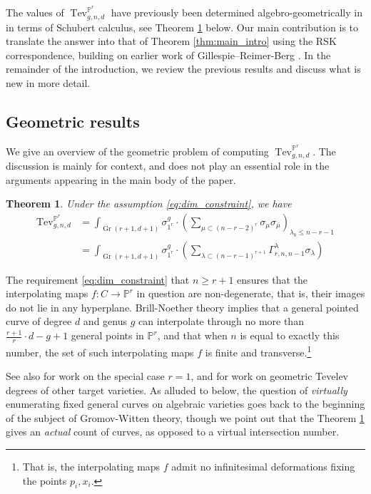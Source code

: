 \documentclass[12pt]{amsart}
\def\bP{\mathbb{P}}
\DeclareMathOperator{\Gr}{Gr}
\DeclareMathOperator{\Tev}{Tev}
\newtheorem{theorem}[definition]{Theorem}
\begin{document}
The values of $\Tev^{\bP^r}_{g,n,d}$ have previously been determined algebro-geometrically in \cite{tev_Pr} in terms of Schubert calculus, see Theorem \ref{thm:tev_Pr} below. Our main contribution is to translate the answer into that of Theorem \ref{thm:main_intro} using the RSK correspondence, building on earlier work of Gillespie--Reimer-Berg \cite{GenRSK}. In the remainder of the introduction, we review the previous results and discuss what is new in more detail.

\subsection{Geometric results}

We give an overview of the geometric problem of computing $\Tev^{\bP^r}_{g,n,d}$. The discussion is mainly for context, and does not play an essential role in the arguments appearing in the main body of the paper.

\begin{theorem}\cite[Theorem 1.1, Theorem 7.9]{tev_Pr}\label{thm:tev_Pr}
Under the assumption \eqref{eq:dim_constraint}, we have
    \begin{align*}
\Tev^{\bP^r}_{g,n,d}&=\displaystyle\int_{\Gr(r+1,d+1)}\sigma^g_{1^r}\cdot \left(\sum_{\mu\subset(n-r-2)^{r}}\sigma_{\mu}\sigma_{\overline{\mu}}\right)_{\lambda_0\le n-r-1}\\
&=\displaystyle\int_{\Gr(r+1,d+1)}\sigma^g_{1^r}\cdot \left(\sum_{\lambda\subset (n-r-1)^{r+1}} \Gamma^\lambda_{r,n,n-1}\sigma_{\lambda}\right)
\end{align*}
\end{theorem}

The requirement \eqref{eq:dim_constraint} that $n\ge r+1$ ensures that the interpolating maps $f:C\to\bP^r$ in question are non-degenerate, that is, their images do not lie in any hyperplane. Brill-Noether theory implies that a general pointed curve of degree $d$ and genus $g$ can interpolate through no more than $\frac{r+1}{r}\cdot d-g+1$ general points in $\bP^r$, and that when $n$ is equal to exactly this number, the set of such interpolating maps $f$ is finite and transverse.\footnote{That is, the interpolating maps $f$ admit no infinitesimal deformations fixing the points $p_i,x_i$.}

See also \cite{tevelev,cps,fl,cl1,Troptev} for work on the special case $r=1$, and \cite{lian_hyp,cl2,cl_hirzebruch,cl_complete,ls} for work on geometric Tevelev degrees of other target varieties. As alluded to below, the question of \emph{virtually} enumerating fixed general curves on algebraic varieties goes back to the beginning of the subject of Gromov-Witten theory, though we point out that the Theorem \ref{thm:tev_Pr} gives an \emph{actual} count of curves, as opposed to a virtual intersection number.
\end{document}
